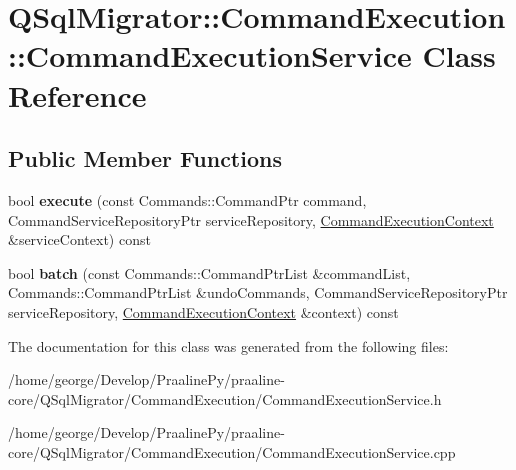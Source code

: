 \hypertarget{class_q_sql_migrator_1_1_command_execution_1_1_command_execution_service}{}\section{Q\+Sql\+Migrator\+:\+:Command\+Execution\+:\+:Command\+Execution\+Service Class Reference}
\label{class_q_sql_migrator_1_1_command_execution_1_1_command_execution_service}
\subsection*{Public Member Functions}
\begin{DoxyCompactItemize}
\item 
\mbox{\label{class_q_sql_migrator_1_1_command_execution_1_1_command_execution_service_ad4414f148b8948ac183abb64e27830b5}} 
bool {\bfseries execute} (const Commands\+::\+Command\+Ptr command, Command\+Service\+Repository\+Ptr service\+Repository, \hyperlink{class_q_sql_migrator_1_1_command_execution_1_1_command_execution_context}{Command\+Execution\+Context} \&service\+Context) const
\item 
\mbox{\label{class_q_sql_migrator_1_1_command_execution_1_1_command_execution_service_a22f05daa1823456f59d9749cef034381}} 
bool {\bfseries batch} (const Commands\+::\+Command\+Ptr\+List \&command\+List, Commands\+::\+Command\+Ptr\+List \&undo\+Commands, Command\+Service\+Repository\+Ptr service\+Repository, \hyperlink{class_q_sql_migrator_1_1_command_execution_1_1_command_execution_context}{Command\+Execution\+Context} \&context) const
\end{DoxyCompactItemize}


The documentation for this class was generated from the following files\+:\begin{DoxyCompactItemize}
\item 
/home/george/\+Develop/\+Praaline\+Py/praaline-\/core/\+Q\+Sql\+Migrator/\+Command\+Execution/Command\+Execution\+Service.\+h\item 
/home/george/\+Develop/\+Praaline\+Py/praaline-\/core/\+Q\+Sql\+Migrator/\+Command\+Execution/Command\+Execution\+Service.\+cpp\end{DoxyCompactItemize}
